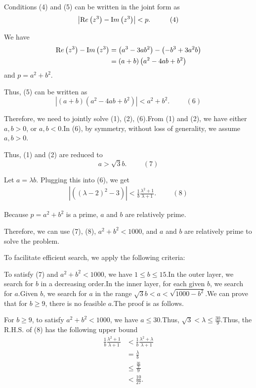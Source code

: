 \begin{enumerate}
{{ Conditions (4) and (5) can be written in the joint form as
 \[\left| {\textrm Re} \left( z^3 \right) - {\textrm Im} \left( z^3 \right) \right| < p . \hspace{1cm} (4)\]

 
We have
 \begin{align*} {\textrm Re} \left( z^3 \right) - {\textrm Im} \left( z^3 \right) & = \left( a^3 - 3 a b^2 \right) - \left( - b^3 + 3 a^2 b \right) \\ & = \left( a + b \right) \left( a^2 - 4 ab + b^2 \right) \end{align*}
and $p = a^2 + b^2$.

 Thus, (5) can be written as
 \[\left| \left( a + b \right) \left( a^2 - 4 ab + b^2 \right)  \right| < a^2 + b^2 . \hspace{1cm} (6)\]

 Therefore, we need to jointly solve (1), (2), (6).From (1) and (2), we have either $a, b >0$, or $a, b < 0$.In (6), by symmetry, without loss of generality, we assume $a, b > 0$.

 Thus, (1) and (2) are reduced to
 \[a > \sqrt{3} b . \hspace{1cm} (7)\]

 Let $a = \lambda b$. Plugging this into (6), we get
 \begin{align*} \left| \left( \left( \lambda - 2 \right)^2 - 3 \right)  \right| < \frac{1}{b} \frac{\lambda^2 + 1}{\lambda + 1} .  \hspace{1cm} (8) \end{align*}


 Because $p= a^2 + b^2$ is a prime, $a$ and $b$ are relatively prime.

 Therefore, we can use (7), (8), $a^2 + b^2 <1000$, and $a$ and $b$ are relatively prime to solve the problem.

 To facilitate efficient search, we apply the following criteria:

 To satisfy (7) and $a^2 + b^2 < 1000$, we have $1 \leq b \leq 15$.In the outer layer, we search for $b$ in a decreasing order.In the inner layer, for each given $b$, we search for $a$.Given $b$, we search for $a$ in the range $\sqrt{3} b < a < \sqrt{1000 - b^2}$.We can prove that for $b \geq 9$, there is no feasible $a$.The proof is as follows.

 For $b \geq 9$, to satisfy $a^2 + b^2 < 1000$, we have $a \leq 30$.Thus, $\sqrt{3} < \lambda \leq \frac{30}{9}$.Thus, the R.H.S. of (8) has the following upper bound
 \begin{align*} \frac{1}{b} \frac{\lambda^2 + 1}{\lambda + 1} & < \frac{1}{b} \frac{\lambda^2 + \lambda}{\lambda + 1} \\ & = \frac{\lambda}{b} \\ & \leq \frac{\frac{30}{9}}{9} \\ & < \frac{10}{27} . \end{align*}


}}
\end{enumerate}

